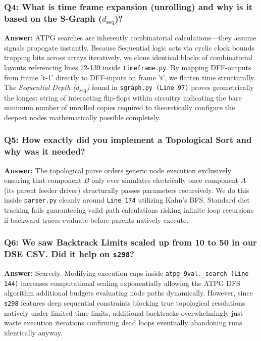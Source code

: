 \documentclass[12pt, a4paper]{article}
\begin{document}
\subsubsection*{Q4: What is time frame expansion (unrolling) and why is it based on the S-Graph ($d_{\text{seq}}$)?}
\textbf{Answer:} ATPG searches are inherently combinatorial calculations—they assume signals propogate instantly. Because Sequential logic acts via cyclic clock bounds trapping bits across arrays iteratively, we clone identical blocks of combinatorial layouts referencing lines 72-139 inside \texttt{timeframe.py}. By mapping DFF-outputs from frame 't-1' directly to DFF-inputs on frame 't', we flatten time structurally. The \textit{Sequential Depth ($d_{\text{seq}}$)} found in \texttt{sgraph.py (Line 97)} proves geometrically the longest string of interacting flip-flops within circuitry indicating the bare minimum number of unrolled copies required to theoretically configure the deepest nodes mathematically possible completely. 

\subsubsection*{Q5: How exactly did you implement a Topological Sort and why was it needed?}
\textbf{Answer:} The topological parse orders generic node execution exclusively ensuring that component $B$ only ever simulates electrically once component $A$ (its parent feeder driver) structurally passes parameters recursively. We do this inside \texttt{parser.py} cleanly around \texttt{Line 174} utilizing Kahn's BFS. Standard dict tracking fails guaranteeing valid path calculations risking infinite loop recursions if backward traces evaluate before parents natively execute.

\subsubsection*{Q6: We saw Backtrack Limits scaled up from 10 to 50 in our DSE CSV. Did it help on \texttt{s298}?}
\textbf{Answer:} Scarcely. Modifying execution caps inside \texttt{atpg\_9val.\_search (Line 144)} increases computational scaling exponentially allowing the ATPG DFS algorithm additional budgets evaluating node paths dynamically. However, since \texttt{s298} features deep sequential constraints blocking true topological resolutions natively under limited time limits, additional backtracks overwhelmingly just waste execution iterations confirming dead loops eventually abandoning runs identically anyway.
\end{document}
